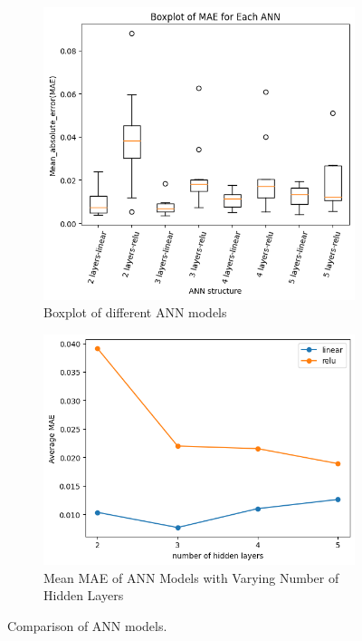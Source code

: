 \documentclass[sigplan,screen]{acmart}
\begin{document}
\begin{figure}
    \begin{subfigure}{0.5\textwidth}
        \includegraphics[width=\linewidth]{boxplot.png}
        \caption{Boxplot of different ANN models}
        \label{fig:boxplot}
    \end{subfigure}
    \begin{subfigure}{0.5\textwidth}
        \includegraphics[width=\linewidth]{layers.png}
        \caption{Mean MAE of ANN Models with Varying Number of Hidden Layers}
        \label{fig:layers}
    \end{subfigure}
    \caption{Comparison of ANN models.}
    \label{fig:comparison}
\end{figure}
\end{document}
